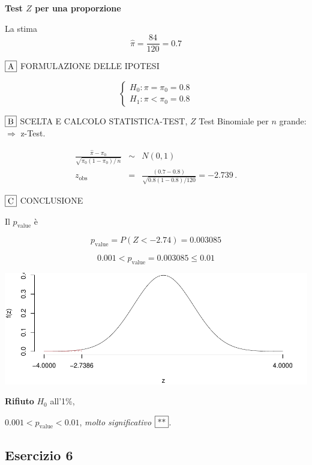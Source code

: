 \documentclass[
  11pt,
]{book}
\theoremstyle{mytheoremstyle}
\theoremstyle{mydefstyle}
\newenvironment{sol}
  {
  \begin{tcolorbox}[enhanced,breakable,arc=0.1mm,boxrule=1pt,colback=white,colframe=iblue,
  title=\bf \fontfamily{lmss}\selectfont \hspace{.5 cm} Soluzione,drop fuzzy shadow]

}{
\end{tcolorbox}
  }
\begin{document}
\begin{sol}
\textbf{Test \(Z\) per una proporzione}

La stima
\[\hat\pi=\frac { 84 } { 120 }= 0.7  \]

\(\fbox{A}\) FORMULAZIONE DELLE IPOTESI

\[\begin{cases}
   H_0: \pi = \pi_0=0.8 \\
   H_1: \pi < \pi_0=0.8 
   \end{cases}\]

\(\fbox{B}\) SCELTA E CALCOLO STATISTICA-TEST, \(Z\)
Test Binomiale per \(n\) grande: \(\Rightarrow\) z-Test.

\begin{eqnarray*}
   \frac{\hat\pi - \pi_{0}} {\sqrt {\pi_0(1-\pi_0)/\,n}}&\sim&N(0,1)\\
   z_{\text{obs}}
   &=& \frac{ ( 0.7 -  0.8 )} {\sqrt{ 0.8 (1- 0.8 )/ 120 }}
   =   -2.739 \,.
   \end{eqnarray*}

\(\fbox{C}\) CONCLUSIONE

Il \(p_{\text{value}}\) è

\[ p_{\text{value}} = P(Z<-2.74)=0.003085 \]

\[
 0.001 < p_\text{value}= 0.003085 \leq 0.01 
\]

\begin{center}\includegraphics{Esami_passati_con_soluzioni_files/figure-latex/2024-130-1} \end{center}

\textbf{Rifiuto} \(H_0\) all'1\%,

\(0.001<p_\text{value}<0.01\), \emph{molto significativo} \(\fbox{**}\).

\end{sol}

\subsection{Esercizio 6}\label{esercizio-6-35}
\end{document}
